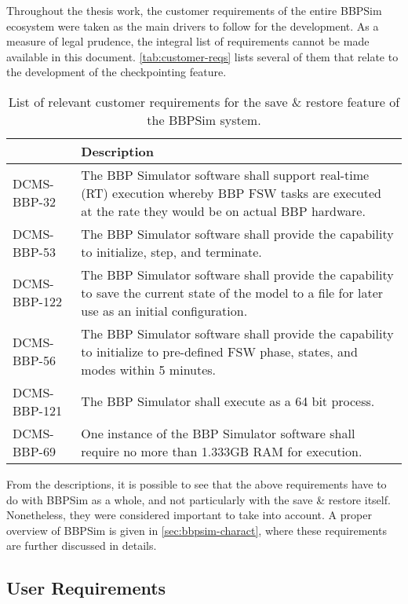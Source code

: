{Throughout the thesis work, the customer requirements of the entire \gls{BBPSim} ecosystem were taken as the main drivers to follow for the development. As a measure of legal prudence, the integral list of requirements cannot be made available in this document. \autoref{tab:customer-reqs} lists several of them that relate to the development of the checkpointing feature.  
\begin{table}[htbp]
	\vspace{12pt}
	\centering
	\begin{tabularx}{\linewidth}{>{\centering}p{3cm} X}
		\toprule
		{\bfseries Requirement\newline Number} & \textbf{Description}\\
		\midrule
		DCMS-BBP-32 & {The BBP Simulator software shall support real-time (RT) execution whereby BBP FSW tasks are executed at the rate they would be on actual BBP hardware.}\\
		\midrule
		DCMS-BBP-53 & {The BBP Simulator software shall provide the capability to initialize, step, and terminate.}\\
		\midrule
		DCMS-BBP-122 & {The BBP Simulator software shall provide the capability to save the current state of the model to a file for later use as an initial configuration.}\\
		\midrule
		DCMS-BBP-56 & {The BBP Simulator software shall provide the capability to initialize to pre-defined FSW phase, states, and modes within 5 minutes.}\\
		\midrule
		DCMS-BBP-121 & {The BBP Simulator shall execute as a 64 bit process.}\\
		\midrule
		DCMS-BBP-69 & {One instance of the BBP Simulator software shall require no more than 1.333GB RAM for execution.}\\
		\bottomrule
	\end{tabularx}
	\caption{List of relevant customer requirements for the save \& restore feature of the \gls{BBPSim} system.}
	\label{tab:customer-reqs}
\end{table}

From the descriptions, it is possible to see that the above requirements have to do with \gls{BBPSim} as a whole, and not particularly with the save \& restore itself. Nonetheless, they were considered important to take into account. A proper overview of \gls{BBPSim} is given in \autoref{sec:bbpsim-charact}, where these requirements are further discussed in details.

\subsection*{User Requirements}

}
